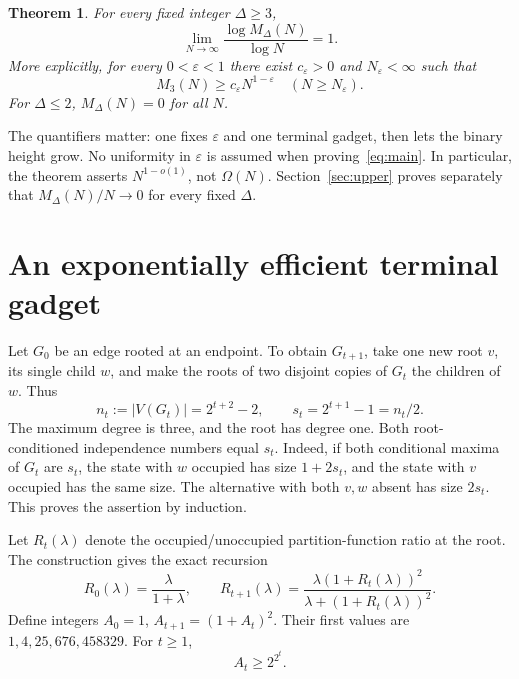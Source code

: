\documentclass[11pt]{article}
\newtheorem{theorem}{Theorem}
\begin{document}
\begin{theorem}\label{thm:main}
For every fixed integer $\Delta\ge3$,
\begin{equation}\label{eq:main}
 \boxed{\lim_{N\to\infty}\frac{\log M_\Delta(N)}{\log N}=1.}
\end{equation}
More explicitly, for every $0<\varepsilon<1$ there exist
$c_\varepsilon>0$ and $N_\varepsilon<\infty$ such that
\[
 M_3(N)\ge c_\varepsilon N^{1-\varepsilon}
 \quad(N\ge N_\varepsilon).
\]
For $\Delta\le2$, $M_\Delta(N)=0$ for all $N$.
\end{theorem}

The quantifiers matter: one fixes $\varepsilon$ and one terminal gadget,
then lets the binary height grow. No uniformity in $\varepsilon$ is
assumed when proving~\eqref{eq:main}. In particular, the theorem asserts
$N^{1-o(1)}$, not $\Omega(N)$. Section~\ref{sec:upper} proves separately
that $M_\Delta(N)/N\to0$ for every fixed $\Delta$.

\section{An exponentially efficient terminal gadget}
Let $G_0$ be an edge rooted at an endpoint. To obtain $G_{t+1}$, take
one new root $v$, its single child $w$, and make the roots of two disjoint
copies of $G_t$ the children of $w$. Thus
\begin{equation}\label{eq:gadgetsize}
 n_t:=|V(G_t)|=2^{t+2}-2,\qquad s_t=2^{t+1}-1=n_t/2.
\end{equation}
The maximum degree is three, and the root has degree one.
Both root-conditioned independence numbers equal $s_t$.
Indeed, if both conditional maxima of $G_t$ are $s_t$, the state with
$w$ occupied has size $1+2s_t$, and the state with $v$ occupied has the
same size. The alternative with both $v,w$ absent has size $2s_t$.
This proves the assertion by induction.

Let $R_t(\lambda)$ denote the occupied/unoccupied partition-function
ratio at the root. The construction gives the exact recursion
\begin{equation}\label{eq:R}
 R_0(\lambda)=\frac{\lambda}{1+\lambda},\qquad
 R_{t+1}(\lambda)=
 \frac{\lambda(1+R_t(\lambda))^2}{\lambda+(1+R_t(\lambda))^2}.
\end{equation}
Define integers $A_0=1$, $A_{t+1}=(1+A_t)^2$. Their first values are
$1,4,25,676,458329$. For $t\ge1$,
\begin{equation}\label{eq:A}
 A_t\ge2^{2^t}.
\end{equation}
\end{document}
